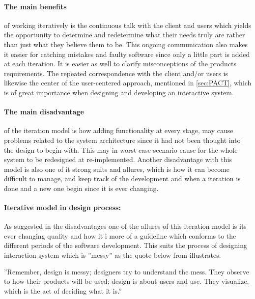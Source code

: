 \paragraph{The main benefits}
of working iteratively is the continuous talk with the client and users which yields the opportunity to determine and redetermine what their needs truly are rather than just what they believe them to be.
This ongoing communication also makes it easier for catching mistakes and faulty software since only a little part is added at each iteration.
It is easier as well to clarify misconceptions of the products requirements.
The repeated correspondence with the client and/or users is likewise the center of the user-centered approach, mentioned in \cref{sec:PACT}, which is of great importance when designing and developing an interactive system.

\paragraph{The main disadvantage} of the iteration model is how adding functionality at every stage, may cause problems related to the system architecture since it had not been thought into the design to begin with.
This may in worst case scenario cause for the whole system to be redesigned at re-implemented.
Another disadvantage with this model is also one of it strong suits and allures, which is how it can become difficult to manage, and keep track of the development and when a iteration is done and a new one begin since it is ever changing.

\paragraph{Iterative model in design process:}
As suggested in the disadvantages one of the allures of this iteration model is its ever changing quality and how it i more of a guideline which conforms to the different periods of the software development.
This suits the process of designing interaction system which is ''messy'' as the quote below from \citep[p.~156]{DesignerStance} illustrates.

''Remember, design is messy; designers try to understand the mess. They observe to how their products will be used; design is about users and use. They visualize, which is the act of deciding what it is.''

